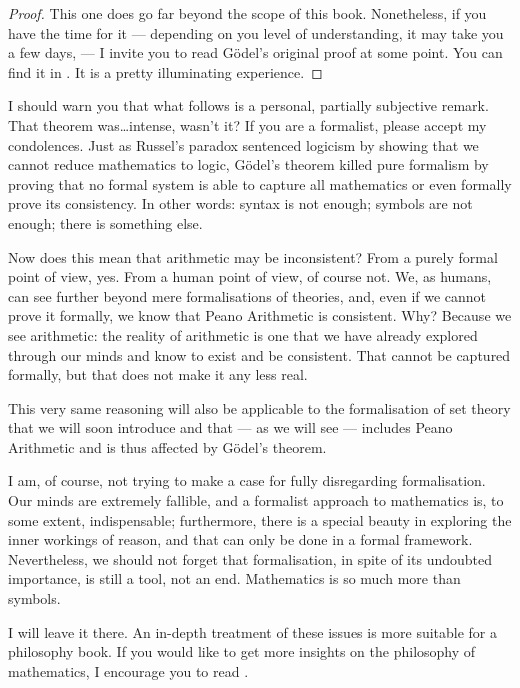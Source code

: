 \begin{proof}
This one does go far beyond the scope of this book. Nonetheless, if you have the time for it --- depending on you level of understanding, it may take you a few days, --- I invite you to read G\"odel's original proof at some point. You can find it in \cite{Godel}. It is a pretty illuminating experience.
\end{proof}

\begin{para}
I should warn you that what follows is a personal, partially subjective remark. That theorem was\ldots intense, wasn't it? If you are a formalist, please accept my condolences.
Just as Russel's paradox sentenced logicism by showing that we cannot reduce mathematics to logic, G\"odel's theorem killed pure formalism by proving that no formal system is able to capture all mathematics or even formally prove its consistency. In other words: syntax is not enough; symbols are not enough; there is something else.

Now does this mean that arithmetic may be inconsistent? 
From a purely formal point of view, yes.
From a human point of view, of course not.
We, as humans, can see further beyond mere formalisations of theories, and, even if we cannot prove it formally, we know that Peano Arithmetic is consistent.
Why? Because we see arithmetic: the reality of arithmetic is one that we have already explored through our minds and know to exist and be consistent.
That cannot be captured formally, but that does not make it any less real.

This very same reasoning will also be applicable to the formalisation of set theory that we will soon introduce and that --- as we will see --- includes Peano Arithmetic and is thus affected by G\"odel's theorem.

I am, of course, not trying to make a case for fully disregarding formalisation.
Our minds are extremely fallible, and a formalist approach to mathematics is, to some extent, indispensable;
furthermore, there is a special beauty in exploring the inner workings of reason, and that can only be done in a formal framework.
Nevertheless, we should not forget that formalisation, in spite of its undoubted importance, is still a tool, not an end. Mathematics is so much more than symbols.

I will leave it there. An in-depth treatment of these issues is more suitable for a philosophy book.
If you would like to get more insights on the philosophy of mathematics, I encourage you to read \cite{Brown}.
\end{para}
